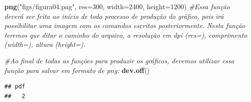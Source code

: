 \documentclass[]{article}
\newenvironment{Shaded}{\begin{snugshade}}{\end{snugshade}}
\newcommand{\CommentTok}[1]{\textcolor[rgb]{0.56,0.35,0.01}{\textit{#1}}}
\newcommand{\DataTypeTok}[1]{\textcolor[rgb]{0.13,0.29,0.53}{#1}}
\newcommand{\DecValTok}[1]{\textcolor[rgb]{0.00,0.00,0.81}{#1}}
\newcommand{\KeywordTok}[1]{\textcolor[rgb]{0.13,0.29,0.53}{\textbf{#1}}}
\newcommand{\NormalTok}[1]{#1}
\newcommand{\StringTok}[1]{\textcolor[rgb]{0.31,0.60,0.02}{#1}}
\begin{document}
\begin{Shaded}
\begin{Highlighting}[]
\KeywordTok{png}\NormalTok{(}\StringTok{"figs/figura04.png"}\NormalTok{, }\DataTypeTok{res=}\DecValTok{300}\NormalTok{, }\DataTypeTok{width=}\DecValTok{2400}\NormalTok{, }\DataTypeTok{height=}\DecValTok{1200}\NormalTok{) }\CommentTok{#Essa função deverá ser feita ao início de todo processo de produção do gráfico, pois irá possibilitar uma imagem com os comandos escritos posteriormente. Nesta função teremos que ditar o caminho do arquivo, a resolução em dpi (res=), comprimento (width=), altura (height=).}

\CommentTok{#Ao final de todas as funções para produzir os gráficos, devemos utilizar essa função para salvar em formato de png:}
\KeywordTok{dev.off}\NormalTok{()}
\end{Highlighting}
\end{Shaded}

\begin{verbatim}
## pdf 
##   2
\end{verbatim}
\end{document}
